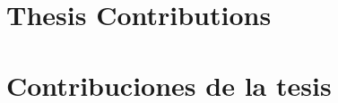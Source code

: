 %

{
  \chapter{Thesis Contributions}
}
{
  \chapter{Contribuciones de la tesis}
}
\label{cha:compendium-contributions}

